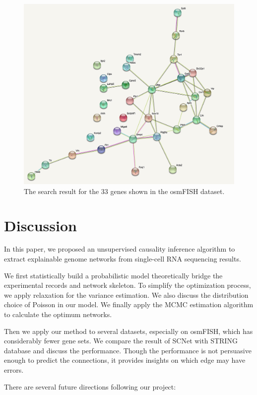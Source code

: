 \documentclass{bioinfo}
\begin{document}
\begin{figure}[H]
    \centering
    \includegraphics[width=\columnwidth]{figure/string.png}
    \caption{The search result for the 33 genes shown in the osmFISH dataset.}
    \label{fig:string}
\end{figure}

\section{Discussion}

In this paper, we proposed an unsupervised causality inference algorithm to extract explainable genome networks from single-cell RNA sequencing results.

We first statistically build a probabilistic model theoretically bridge the experimental records and network skeleton. To simplify the optimization process, we apply relaxation for the variance estimation. We also discuss the distribution choice of Poisson in our model. We finally apply the MCMC estimation algorithm to calculate the optimum networks.

Then we apply our method to several datasets, especially on osmFISH, which has considerably fewer gene sets. We compare the result of SCNet with STRING database and discuss the performance. Though the performance is not persuasive enough to predict the connections, it provides insights on which edge may have errors.

There are several future directions following our project:
\end{document}
